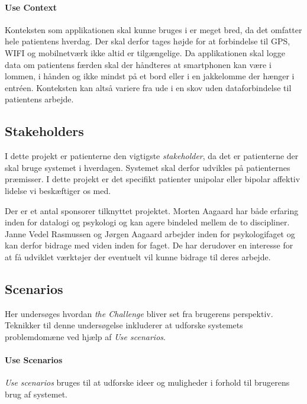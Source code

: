 \paragraph{Use Context}
Konteksten som applikationen skal kunne bruges i er meget bred, da det omfatter hele patientens hverdag.
Der skal derfor tages højde for at forbindelse til GPS, WIFI og mobilnetværk ikke altid er tilgængelige.
Da applikationen skal logge data om patientens færden skal der håndteres at smartphonen kan være i lommen, i hånden og ikke mindst på et bord eller i en jakkelomme der hænger i entréen.
Konteksten kan altså variere fra ude i en skov uden dataforbindelse til patientens arbejde.

\subsection{Stakeholders}
I dette projekt er patienterne den vigtigste \textit{stakeholder}, da det er patienterne der skal bruge systemet i hverdagen.
Systemet skal derfor udvikles på patienternes præmisser.
I dette projekt er det specifikt patienter unipolar eller bipolar affektiv lidelse vi beskæftiger os med.

Der er et antal sponsorer tilknyttet projektet.
Morten Aagaard har både erfaring inden for datalogi og psykologi og kan agere bindeled mellem de to discipliner.
Janne Vedel Rasmussen og Jørgen Aagaard arbejder inden for psykologifaget og kan derfor bidrage med viden inden for faget.
De har derudover en interesse for at få udviklet værktøjer der eventuelt vil kunne bidrage til deres arbejde.

\subsection{Scenarios}
Her undersøges hvordan \textit{the Challenge} bliver set fra brugerens perspektiv.
Teknikker til denne undersøgelse inkluderer at udforske systemets problemdomæne ved hjælp af \textit{Use scenarios}.

\paragraph{Use Scenarios}
\textit{Use scenarios} bruges til at udforske ideer og muligheder i forhold til brugerens brug af systemet.

